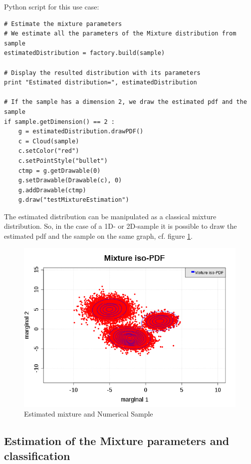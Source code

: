 \espace
Python script for this use case:

\begin{lstlisting}
# Estimate the mixture parameters
# We estimate all the parameters of the Mixture distribution from sample
estimatedDistribution = factory.build(sample)

# Display the resulted distribution with its parameters
print "Estimated distribution=", estimatedDistribution

# If the sample has a dimension 2, we draw the estimated pdf and the sample
if sample.getDimension() == 2 : 
    g = estimatedDistribution.drawPDF()
    c = Cloud(sample)
    c.setColor("red")
    c.setPointStyle("bullet")
    ctmp = g.getDrawable(0)
    g.setDrawable(Drawable(c), 0)
    g.addDrawable(ctmp)
    g.draw("testMixtureEstimation")

\end{lstlisting}
The estimated distribution can be manipulated as a classical mixture distribution. So, in the case of a 1D- or 2D-sample it is possible to draw the estimated pdf and the sample on the same graph, cf. figure \ref{fig:showMixmodResult}.

\begin{figure}[h]
 \centering
 \includegraphics[scale=0.4]{testMixMod.png}
 \caption{Estimated mixture and Numerical Sample}
 \label{fig:showMixmodResult}
\end{figure}

\subsection{Estimation of the Mixture parameters and classification}


